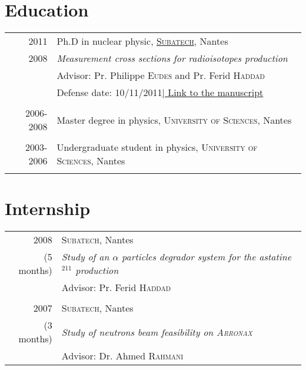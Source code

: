 \documentclass[a4paper,10pt]{article}
\begin{document}
\section{Education}
\begin{tabular}{r|l}	
 2011 & Ph.D in nuclear physic, \hyperlink{http://www-subatech.in2p3.fr/fr/recherche/nucleaire-et-sante/prisma/presentation}{\textsc{Subatech}}, Nantes\\
 2008 & \emph{Measurement cross sections for radioisotopes production}\\
 & Advisor: Pr. Philippe \textsc{Eudes} and Pr. Ferid \textsc{Haddad}\\
 & Defense date: 10/11/2011\hyperlink{https://tel.archives-ouvertes.fr/tel-00662649}{\hfill | \footnotesize Link to the manuscript}\\
 \multicolumn{2}{c}{}\\
 2006-2008 & Master degree in physics, \textsc{University of Sciences}, Nantes\\
 \multicolumn{2}{c}{}\\
 2003-2006 & Undergraduate student in physics, \textsc{University of Sciences}, Nantes\\
 \multicolumn{2}{c}{}\\
\end{tabular}

\section{Internship}
\begin{tabular}{r|l}
 2008 & \textsc{Subatech}, Nantes\\
 \footnotesize{(5 months)}& \emph{Study of an $\alpha$ particles degrador system for the astatine$^{211}$ production}\\
 &Advisor: Pr. Ferid \textsc{Haddad}\\
 \multicolumn{2}{c}{}\\
 2007 & \textsc{Subatech}, Nantes\\
 \footnotesize{(3 months)}& \emph{Study of neutrons beam feasibility on \textsc{Arronax}}\\
 &Advisor: Dr. Ahmed \textsc{Rahmani}\\
\end{tabular}
\end{document}
